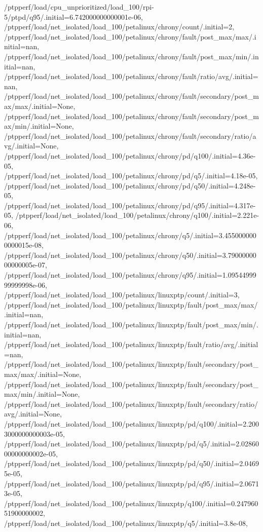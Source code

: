 {    /ptpperf/load/cpu_unprioritized/load_100/rpi-5/ptpd/q95/.initial=6.742000000000001e-06,
    /ptpperf/load/net_isolated/load_100/petalinux/chrony/count/.initial=2,
    /ptpperf/load/net_isolated/load_100/petalinux/chrony/fault/post_max/max/.initial=nan,
    /ptpperf/load/net_isolated/load_100/petalinux/chrony/fault/post_max/min/.initial=nan,
    /ptpperf/load/net_isolated/load_100/petalinux/chrony/fault/ratio/avg/.initial=nan,
    /ptpperf/load/net_isolated/load_100/petalinux/chrony/fault/secondary/post_max/max/.initial=None,
    /ptpperf/load/net_isolated/load_100/petalinux/chrony/fault/secondary/post_max/min/.initial=None,
    /ptpperf/load/net_isolated/load_100/petalinux/chrony/fault/secondary/ratio/avg/.initial=None,
    /ptpperf/load/net_isolated/load_100/petalinux/chrony/pd/q100/.initial=4.36e-05,
    /ptpperf/load/net_isolated/load_100/petalinux/chrony/pd/q5/.initial=4.18e-05,
    /ptpperf/load/net_isolated/load_100/petalinux/chrony/pd/q50/.initial=4.248e-05,
    /ptpperf/load/net_isolated/load_100/petalinux/chrony/pd/q95/.initial=4.317e-05,
    /ptpperf/load/net_isolated/load_100/petalinux/chrony/q100/.initial=2.221e-06,
    /ptpperf/load/net_isolated/load_100/petalinux/chrony/q5/.initial=3.4550000000000015e-08,
    /ptpperf/load/net_isolated/load_100/petalinux/chrony/q50/.initial=3.7900000000000005e-07,
    /ptpperf/load/net_isolated/load_100/petalinux/chrony/q95/.initial=1.0954499999999998e-06,
    /ptpperf/load/net_isolated/load_100/petalinux/linuxptp/count/.initial=3,
    /ptpperf/load/net_isolated/load_100/petalinux/linuxptp/fault/post_max/max/.initial=nan,
    /ptpperf/load/net_isolated/load_100/petalinux/linuxptp/fault/post_max/min/.initial=nan,
    /ptpperf/load/net_isolated/load_100/petalinux/linuxptp/fault/ratio/avg/.initial=nan,
    /ptpperf/load/net_isolated/load_100/petalinux/linuxptp/fault/secondary/post_max/max/.initial=None,
    /ptpperf/load/net_isolated/load_100/petalinux/linuxptp/fault/secondary/post_max/min/.initial=None,
    /ptpperf/load/net_isolated/load_100/petalinux/linuxptp/fault/secondary/ratio/avg/.initial=None,
    /ptpperf/load/net_isolated/load_100/petalinux/linuxptp/pd/q100/.initial=2.2003000000000003e-05,
    /ptpperf/load/net_isolated/load_100/petalinux/linuxptp/pd/q5/.initial=2.0286000000000002e-05,
    /ptpperf/load/net_isolated/load_100/petalinux/linuxptp/pd/q50/.initial=2.04695e-05,
    /ptpperf/load/net_isolated/load_100/petalinux/linuxptp/pd/q95/.initial=2.06713e-05,
    /ptpperf/load/net_isolated/load_100/petalinux/linuxptp/q100/.initial=0.24796051900000002,
    /ptpperf/load/net_isolated/load_100/petalinux/linuxptp/q5/.initial=3.8e-08,
}
